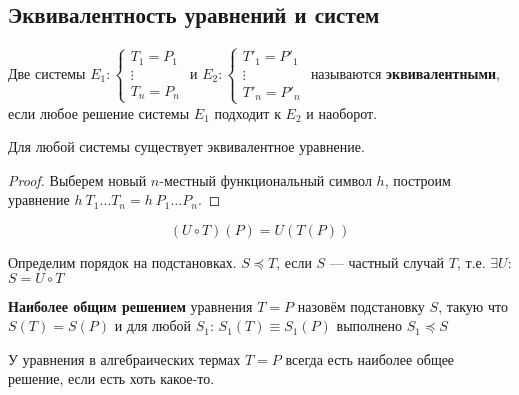 \subsection{Эквивалентность уравнений и систем}

\begin{definition}
    Две системы \(E_1 : \begin{cases}
        T_1 = P_1 \\
        \vdots    \\
        T_n = P_n
    \end{cases}\) и \(E_2 : \begin{cases}
        T'_1 = P'_1 \\
        \vdots      \\
        T'_n = P'_n
    \end{cases}\) называются \textbf{эквивалентными}, если любое решение системы \(E_1\) подходит к \(E_2\) и наоборот.
\end{definition}

\begin{statement}
    Для любой системы существует эквивалентное уравнение.
\end{statement}

\begin{proof}
    Выберем новый \(n\)-местный функциональный символ \(h\), построим уравнение \(h\ T_1 \dots T_n = h\ P_1 \dots P_n\).
\end{proof}

\begin{definition}
    \[(U \circ T) (P) = U(T(P))\]
\end{definition}

\begin{definition}
    Определим порядок на подстановках. \(S \preceq T\), если \(S\) --- частный случай \(T\), т.е. \(\exists U\): \(S = U \circ T\)
\end{definition}

\begin{definition}
    \textbf{Наиболее общим решением} уравнения \(T = P\) назовём подстановку \(S\), такую что \(S(T) = S(P)\) и для любой \(S_1\): \(S_1(T) \equiv S_1(P)\) выполнено \(S_1 \preceq S\)
\end{definition}

\begin{theorem}
    У уравнения в алгебраических термах \(T = P\) всегда есть наиболее общее решение, если есть хоть какое-то.
\end{theorem}

